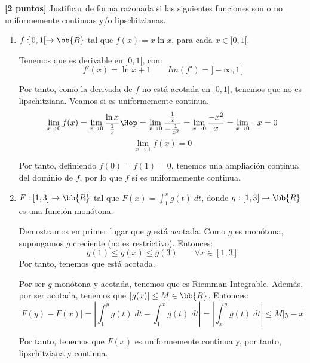 \documentclass[12pt]{article}
\begin{document}
    \begin{ejercicio}\textbf{[2 puntos]}
Justificar de forma razonada si las siguientes funciones son o no uniformemente continuas y/o lipschitzianas.

\begin{enumerate}
    \item $f:]0,1[\to \bb{R}$ tal que $f(x)=x\ln x$, para cada $x\in ]0,1[$.

    Tenemos que es derivable en $]0,1[$, con:
    \begin{equation*}
        f'(x)=\ln x + 1 \qquad Im(f')=]-\infty, 1[
    \end{equation*}

    Por tanto, como la derivada de $f$ no está acotada en $]0,1[$, tenemos que no es lipschitziana. Veamos si es uniformemente continua.
    \begin{equation*}
        \lim_{x\to 0} f(x)
        = \lim_{x\to 0} \frac{\ln x}{\frac{1}{x}}
        \Hop
        = \lim_{x\to 0} \frac{\frac{1}{x}}{-\frac{1}{x^2}}
        = \lim_{x\to 0} \frac{-x^2}{x}
        = \lim_{x\to 0} -x=0
    \end{equation*}
    \begin{equation*}
        \lim_{x\to 1} f(x)=0
    \end{equation*}

    Por tanto, definiendo $f(0)=f(1)=0$, tenemos una ampliación continua del dominio de $f$, por lo que $f$ sí es uniformemente continua.

    \item $F:[1,3]\to \bb{R}$ tal que $F(x)=\int_1^x g(t)\;dt$, donde $g:[1,3]\to \bb{R}$ es una función monótona.

    Demostramos en primer lugar que $g$ está acotada. Como $g$ es monótona, supongamos $g$ creciente (no es restrictivo). Entonces:
    \begin{equation*}
        g(1)\leq g(x)\leq g(3)\qquad \forall x\in [1,3]
    \end{equation*}
    Por tanto, tenemos que está acotada.

    Por ser $g$ monótona y acotada, tenemos que es Riemman Integrable. Además, por ser acotada, tenemos que $|g(x)|\leq M\in \bb{R}$. Entonces:
    \begin{equation*}
        |F(y)-F(x)|=\left|\int_1^y g(t)\;dt -\int_1^x g(t)\;dt\right|
        = \left|\int_x^y g(t)\;dt\right|
        \leq M|y-x|
    \end{equation*}

    Por tanto, tenemos que $F(x)$ es uniformemente continua y, por tanto, lipschitziana y continua.
\end{enumerate}
\end{ejercicio}
\end{document}
